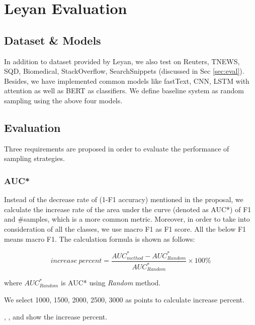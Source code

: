 \section{Leyan Evaluation}
\label{sec:leyan}

\subsection{Dataset \& Models}
In addition to dataset provided by Leyan, we also test on Reuters, TNEWS, SQD, Biomedical, StackOverflow, SearchSnippets (discussed in Sec \ref{sec:eval}). Besides, we have implemented common models like fastText, CNN, LSTM with attention as well as BERT as classifiers. We define baseline system as random sampling using the above four models.

\subsection{Evaluation}
Three requirements are proposed in order to evaluate the performance of sampling strategies.
\subsubsection{AUC*}

Instead of the decrease rate of (1-F1 accuracy) mentioned in the proposal, we calculate the increase rate of the area under the curve (denoted as AUC*) of F1 and \#samples, which is a more common metric. 
Moreover, in order to take into consideration of all the classes, we use macro F1 as F1 score. All the below F1 means macro F1. The calculation formula is shown as follows:

$$increase\ percent = \frac{AUC^*_{method}- AUC^*_{Random}}{AUC^*_{Random}} \times 100\%$$

where $AUC^*_{Random}$ is AUC* using \textit{Random} method. 

We select 1000, 1500, 2000, 2500, 3000 as points to calculate increase percent.

, ,   and  show the increase percent.

